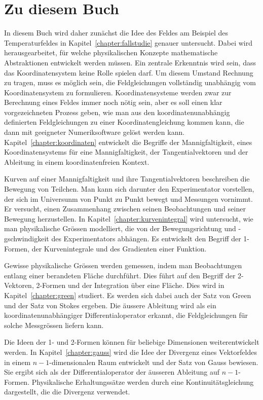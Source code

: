 %
%
%
\section{Zu diesem Buch}
In diesem Buch wird daher zunächst die Idee des Feldes am 
Beispiel des Temperaturfeldes in Kapitel~\ref{chapter:fallstudie}
genauer untersucht.
Dabei wird herausgearbeitet, für welche physikalischen Konzepte
mathematische Abstraktionen entwickelt werden müssen.
Ein zentrale Erkenntnis wird sein, dass das Koordinatensystem keine
Rolle spielen darf.
Um diesem Umstand Rechnung zu tragen, muss es möglich sein, die
Feldgleichungen vollständig unabhängig vom Koordinatensystem
zu formulieren.
Koordinatensysteme werden zwar zur Berechnung eines Feldes immer
noch nötig sein, aber es soll einen klar vorgezeichneten Prozess
geben, wie man aus den koordinatenunabhängig definierten Feldgleichungen
zu einer Koordinatengleichung kommen kann, die dann mit geeigneter
Numeriksoftware gelöst werden kann.
Kapitel~\ref{chapter:koordinaten} entwickelt die Begriffe der
Mannigfaltigkeit, eines Koordinatensystems für eine Mannigfaltigkeit,
der Tangentialvektoren und der Ableitung in einem koordinatenfreien
Kontext.

Kurven auf einer Mannigfaltigkeit und ihre Tangentialvektoren 
beschreiben die Bewegung von Teilchen.
Man kann sich darunter den Experimentator vorstellen, der sich
im Universunm von Punkt zu Punkt bewegt und Messungen vornimmt.
Er versucht, einen Zusammenhang zwischen seinen Beobachtungen
und seiner Bewegung herzustellen.
In Kapitel~\ref{chapter:kurvenintegral} wird untersucht, wie man
physikalische Grössen modelliert, die von der Bewegungsrichtung
und -gschwindigkeit des Experimentators abhängen.
Es entwickelt den Begriff der 1-Formen, der Kurvenintegrale und
des Gradienten einer Funktion.
%
%

Gewisse physikalische Grössen werden gemessen, indem man Beobachtungen
entlang einer berandeten Fläche durchführt.
Dies führt auf den Begriff der 2-Vektoren, 2-Formen und der Integration
über eine Fläche.
%
%
Dies wird in Kapitel~\ref{chapter:green} studiert.
Es werden sich dabei auch der Satz von Green und der Satz von Stokes
ergeben.
Die äussere Ableitung wird als ein koordinatenunabhängiger
Differentialoperator erkannt, die Feldgleichungen für solche
Messgrössen liefern kann.

Die Ideen der 1- und 2-Formen können für beliebige Dimensionen
weiterentwickelt werden.
In Kapitel~\ref{chapter:gauss} wird die Idee der Divergenz eines
Vektorfeldes in einem $n-1$-dimensionalen Raum entwickelt und der
Satz von Gauss bewiesen.
Sie ergibt sich als der Differentialoperator der äusseren Ableitung
auf $n-1$-Formen.
Physikalische Erhaltungssätze werden durch eine Kontinuitätsgleichung
%
dargestellt, die die Divergenz verwendet.
%

